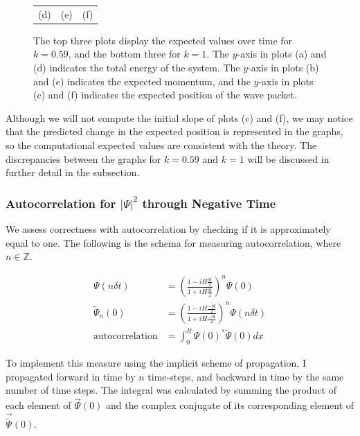\documentclass[letterpaper,12pt]{article}
\begin{document}
\begin{figure}[H]
\begin{tabular}{ccc}
            \\
            (d) & (e) & (f)
        \end{tabular}
        \caption[Expected Values for a Large Well for $k = 0.59, 1$]{The top
        three plots display the expected values over time for
        $k = 0.59$, and the bottom three for $k = 1$. The $y$-axis in plots (a)
        and (d) indicates the total energy of the system. The $y$-axis in plots
        (b) and (e) indicates the expected momentum, and the $y$-axis in
        plots (c) and (f) indicates the expected position of the wave packet.}
        \label{fig:w}
    \end{figure}

    Although we will not compute the initial slope of plots (c) and (f), we may
    notice that the predicted change in the expected position is represented in
    the graphs, so the computational expected values are consistent with the
    theory. The discrepancies between the graphs for $k = 0.59$ and $k = 1$ will
    be discussed in further detail in the  subsection.

    \subsubsection*{Autocorrelation for $\left| \Psi \right| ^ 2$ through
    Negative Time}

    We assess correctness with autocorrelation by checking if it is
    approximately equal to one.
    The following is the schema for measuring autocorrelation, where
    $n \in \mathbb{Z}$.

    \begin{align*}
        \Psi(n \delta t) &=
        \left(
        \frac{1 - iH\frac{\delta t}{2}}{1 + iH\frac{\delta t}{2}}
        \right)^n
        \Psi(0)
        \\
        {\tilde{\Psi}}_n(0) &=
        \left(
        \frac{1 - iH\frac{-\delta t}{2}}{1 + iH\frac{-\delta t}{2}}
        \right)^n
        \Psi(n \delta t)
        \\
        \mathrm{autocorrelation} &=
        \int_0^R \Psi(0)^* \tilde{\Psi}(0) dx
    \end{align*}

    To implement this measure using the implicit scheme of propagation, I
    propagated forward in time by $n$ time-steps, and backward in time by the
    same number of time steps. The integral was calculated by summing the
    product of each element of $\vec{\Psi}(0)$ and the complex conjugate of its
    corresponding element of $\vec{\tilde{\Psi}}(0)$.
\end{document}
